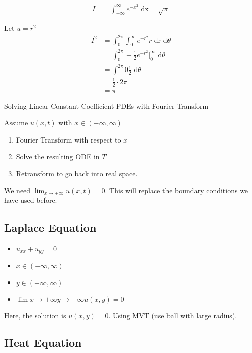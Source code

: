 %
\begin{align}
  I & = \int^\infty_{-\infty} e^{-x^2} \text{ dx} = \sqrt{\pi}
\end{align}

Let $u = r^2$
%
\begin{align}
  I^2 & = \int^{2\pi}_0 \int^\infty_0 e^{-r^2} r \text{ dr d}\theta\\
  & = \int^{2\pi}_0 -\frac{1}{2} e^{-r^2} \Big|^\infty_0 \text{ d}\theta\\
  & = \int^{2 \pi}{0} \frac{1}{2} \text{ d}\theta\\
  & = \frac{1}{2} \cdot 2 \pi\\
  & = \pi
\end{align}

Solving Linear Constant Coefficient PDEs with Fourier Transform

Assume $u(x, t)$ with $x \in (-\infty, \infty)$
\begin{enumerate}
  \item Fourier Transform with respect to $x$
  \item Solve the resulting ODE in $T$
  \item Retransform to go back into real space.
\end{enumerate}

We need $\displaystyle \lim_{x \to \pm \infty} u(x, t) = 0$. This will replace the boundary conditions we have used before.

\bigbreak

\subsection{Laplace Equation}
\begin{itemize}
  \item $u_{xx} + u_{yy} = 0$
  \item $x \in (-\infty, \infty)$
  \item $y \in (-\infty, \infty)$
  \item $\displaystyle \lim{x \to \pm \infty}{y \to \pm \infty} u(x, y) = 0$
\end{itemize}
Here, the solution is $u(x, y) = 0$. Using MVT (use ball with large radius).

\bigbreak

\subsection{Heat Equation}

